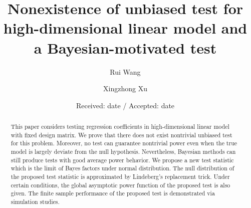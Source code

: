 \documentclass[smallextended]{svjour3}       %
\begin{document}
\title{
Nonexistence of unbiased test for high-dimensional linear model and a Bayesian-motivated test 
}


\author{ Rui Wang         \and
        Xingzhong Xu %
}



\date{Received: date / Accepted: date}


\maketitle

\begin{abstract}

This paper considers testing regression coefficients in high-dimensional linear model with fixed design matrix.
    We prove that there does not exist nontrivial unbiased test for this problem.
    Moreover, no test can guarantee nontrivial power even when the true model is largely deviate from the null hypothesis.
    Nevertheless, Bayesian methods can still produce tests with good average power behavior.
    We propose a new test statistic which is the limit of Bayes factors under normal distribution.
    The null distribution of the proposed test statistic is approximated by Lindeberg's replacement trick.
    Under certain conditions, the global asymptotic power function of the proposed test is also given.
    The finite sample performance of the proposed test is demonstrated via simulation studies.
\end{abstract}
\end{document}
